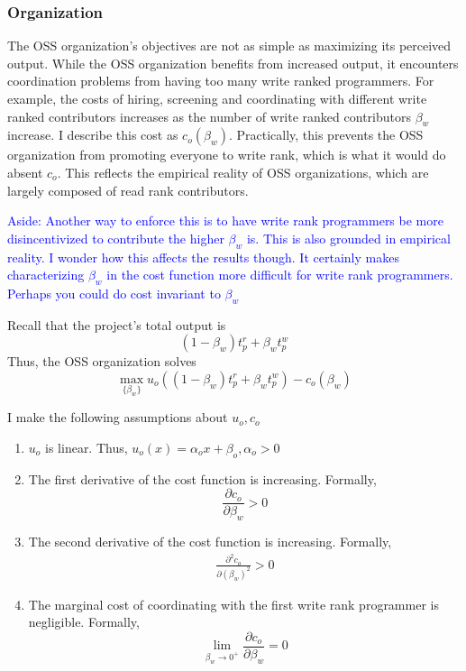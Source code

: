 \documentclass[source/paper/main.tex]{subfiles}
\begin{document}
\subsubsection{Organization}
The OSS organization's objectives are not as simple as maximizing its perceived output. While the OSS organization benefits from increased output, it encounters coordination problems from having too many write ranked programmers. For example, the costs of hiring, screening and coordinating with different write ranked contributors increases as the number of write ranked contributors $\beta_w$ increase. I describe this cost as $c_o(\beta_w)$. Practically, this prevents the OSS organization from promoting everyone to write rank, which is what it would do absent $c_o$. This reflects the empirical reality of OSS organizations, which are largely composed of read rank contributors. 

\textcolor{blue}{Aside: Another way to enforce this is to have write rank programmers be more disincentivized to contribute the higher $\beta_w$ is. This is also grounded in empirical reality. I wonder how this affects the results though. It certainly makes characterizing $\beta_w$ in the cost function more difficult for write rank programmers. Perhaps you could do cost invariant to $\beta_w$}

\qquad Recall that the project's total output is 
$$(1-\beta_w) t_p^r + \beta_w t_p^w$$
Thus, the OSS organization solves
$$\max_{\{\beta_w\}} u_o\left((1-\beta_w) t_p^r + \beta_w t_p^w\right) - c_o(\beta_w)$$ 

I make the following assumptions about $u_o, c_o$
\begin{enumerate}
    \item $u_o$ is linear. Thus, $u_o(x) = \alpha_ox + \beta_o, \alpha_o > 0$
    \item The first derivative of the cost function is increasing. Formally, 
    $$\frac{\partial c_o}{\partial \beta_w}>0$$
    \item  The second derivative of the cost function is increasing. Formally, 
    \begin{align}
        \frac{\partial^2 c_o}{\partial (\beta_w)^2}>0 \label{org_concave_cost}
    \end{align}
    \item The marginal cost of coordinating with the first write rank programmer is negligible. Formally,
    $$\lim_{\beta_w \to 0^+} \frac{\partial c_o}{\partial \beta_w} = 0 $$
\end{enumerate}
\end{document}
